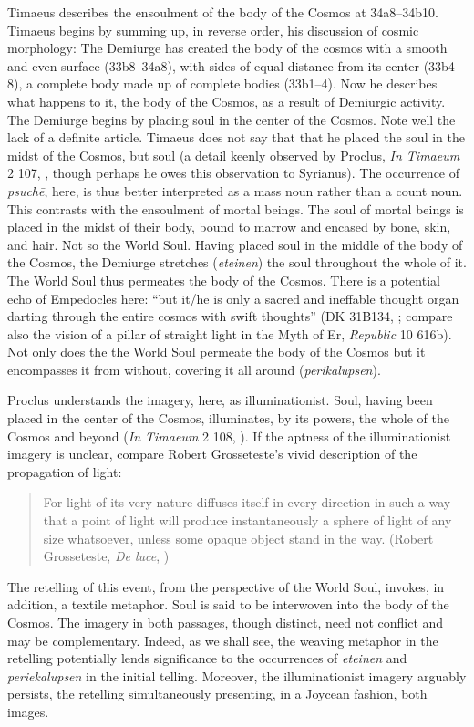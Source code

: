 Timaeus describes the ensoulment of the body of the Cosmos at 34a8--34b10. Timae\-us begins by summing up, in reverse order, his discussion of cosmic morphology: The Demiurge has created the body of the cosmos with a smooth and even surface (33b8--34a8), with sides of equal distance from its center (33b4--8), a complete body made up of complete bodies (33b1--4). Now he describes what happens to it, the body of the Cosmos, as a result of Demiurgic activity. The Demiurge begins by placing soul in the center of the Cosmos. Note well the lack of a definite article. Timaeus does not say that that he placed the soul in the midst of the Cosmos, but soul (a detail keenly observed by Proclus, \emph{In Timaeum} 2 107, \citealt{Diehl:1903re}, though perhaps he owes this observation to Syrianus). The occurrence of \emph{psuchē}, here, is thus better interpreted as a mass noun rather than a count noun. This contrasts with the ensoulment of mortal beings. The soul of mortal beings is placed in the midst of their body, bound to marrow and encased by bone, skin, and hair. Not so the World Soul. Having placed soul in the middle of the body of the Cosmos, the Demiurge stretches (\emph{eteinen}) the soul throughout the whole of it. The World Soul thus permeates the body of the Cosmos. There is a potential echo of Empedocles here: ``but it/he is only a sacred and ineffable thought organ darting through the entire cosmos with swift thoughts'' (DK 31B134, \citealt[263]{Inwood:2001ve}; compare also the vision of a pillar of straight light in the Myth of Er, \emph{Republic} 10 616b). Not only does the the World Soul permeate the body of the Cosmos but it encompasses it from without, covering it all around (\emph{perikalupsen}). 

Proclus understands the imagery, here, as illuminationist. Soul, having been placed in the center of the Cosmos, illuminates, by its powers, the whole of the Cosmos and beyond (\emph{In Timaeum} 2 108, \citealt{Diehl:1903re}). If the aptness of the illuminationist imagery is unclear, compare Robert Grosseteste's vivid description of the propagation of light:
\begin{quote}
	For light of its very nature diffuses itself in every direction in such a way that a point of light will produce instantaneously a sphere of light of any size whatsoever, unless some opaque object stand in the way. (Robert Grosseteste, \emph{De luce}, \citealt[10]{Riedl:1942it})
\end{quote}
The retelling of this event, from the perspective of the World Soul, invokes, in addition, a textile metaphor. Soul is said to be interwoven into the body of the Cosmos. The imagery in both passages, though distinct, need not conflict and may be complementary. Indeed, as we shall see, the weaving metaphor in the retelling potentially lends significance to the occurrences of \emph{eteinen} and \emph{periekalupsen} in the initial telling. Moreover, the illuminationist imagery arguably persists, the retelling simultaneously presenting, in a Joycean fashion, both images.


